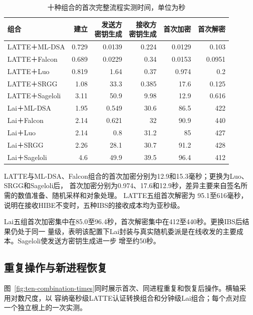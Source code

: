 \begin{table}[H]
\centering\small
\caption{十种组合的首次完整流程实测时间，单位为秒}
\label{tab:ten-first-times}
\setlength{\tabcolsep}{4pt}
\begin{tabular}{@{}lrrrrr@{}}
\toprule
\rowcolor{black!8} 组合 & 建立 & \shortstack{发送方\\密钥生成} & \shortstack{接收方\\密钥生成} & 首次加密 & 首次解密 \\
\midrule
LATTE＋ML-DSA & 0.729 & 0.0139 & 0.224 & 0.0129 & 0.103 \\
LATTE＋Falcon & 0.689 & 0.0229 & 0.34 & 0.0153 & 0.0951 \\
LATTE＋Luo & 0.819 & 1.64 & 0.37 & 0.974 & 0.2 \\
LATTE＋SRGG & 1.08 & 33.3 & 0.385 & 17.6 & 0.125 \\
LATTE＋Sageloli & 3.11 & 50.9 & 9.98 & 12.9 & 0.616 \\
Lai＋ML-DSA & 1.95 & 0.549 & 30.6 & 86.5 & 422 \\
Lai＋Falcon & 2.14 & 0.621 & 32 & 90.9 & 440 \\
Lai＋Luo & 2.14 & 0.8 & 31.2 & 85 & 427 \\
Lai＋SRGG & 2.26 & 28.1 & 30.7 & 91.2 & 428 \\
Lai＋Sageloli & 4.6 & 49.9 & 39.5 & 96.4 & 412 \\
\bottomrule
\end{tabular}
\end{table}

LATTE与ML-DSA、Falcon组合的首次加密分别为12.9和15.3毫秒；更换为Luo、SRGG和Sageloli后，
首次加密分别为0.974、17.6和12.9秒，差异主要来自签名所需的数值准备、随机采样和对象处理。
LATTE五组首次解密为
95.1至616毫秒，说明在接收HIBE不变时，五种IBS的接收成本均为亚秒级。

Lai五组首次加密集中在85.0至96.4秒，首次解密集中在412至440秒。更换IBS后结果仍处于同一
量级，表明该配置下Lai封装与真实随机委派是在线收发的主要成本。Sageloli使发送方密钥生成进一步
增至约50秒。

\subsection{重复操作与新进程恢复}

图~\ref{fig:ten-combination-times}同时展示首次、同进程重复和恢复后操作。横轴采用对数尺度，以
容纳毫秒级LATTE认证转换组合和分钟级Lai组合；每个点对应一个独立根上的一次实测。

